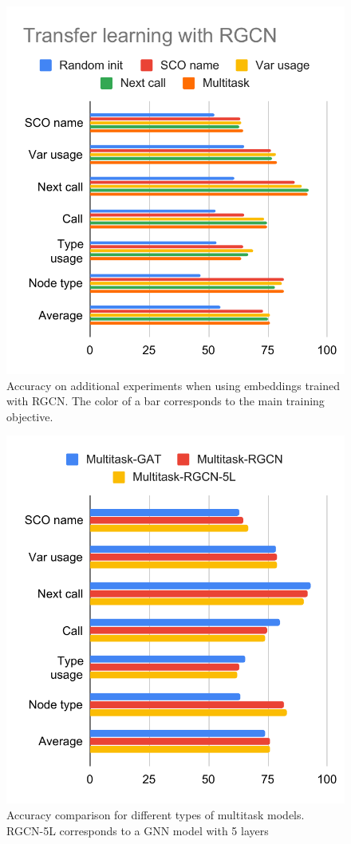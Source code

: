 \documentclass[a4paper,twoside]{article}
\begin{document}
\begin{figure}[]
    \centering
    \includegraphics{transfer_rgcn.pdf}
    \caption{Accuracy on additional experiments when using embeddings trained with RGCN\@. The color of a bar corresponds to the main training objective.}\label{fig:transfer_rgcn}
\end{figure}

\begin{figure}[]
    \centering
    \includegraphics{mt_comparison.pdf}
    \caption{Accuracy comparison for different types of multitask models. RGCN-5L corresponds to a GNN model with 5 layers}\label{fig:mt_comparison}
\end{figure}
\end{document}
